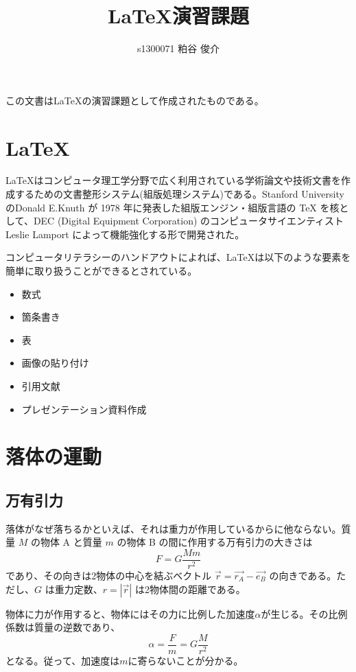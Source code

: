 \documentclass[platex,a4paper,12pt,dvipdfmx]{jsarticle}
\title{{\LaTeX}演習課題}
\author{s1300071  粕谷 俊介}
\begin{document}
\maketitle %
この文書は{\LaTeX}の演習課題として作成されたものである。

\section{\LaTeX}

\LaTeX はコンピュータ理工学分野で広く利用されている学術論文や技術文書を作成するための文書整形システム(組版処理システム)である。Stanford UniversityのDonald E.Knuth が 1978 年に発表した組版エンジン・組版言語の TeX を核として、DEC (Digital Equipment Corporation) のコンピュータサイエンティスト Leslie Lamport によって機能強化する形で開発された。

コンピュータリテラシーのハンドアウト\cite{lit}によれば、\LaTeX は以下のような要素を簡単に取り扱うことができるとされている。

\begin{itemize}
  \item 数式
  \item 箇条書き
  \item 表
  \item 画像の貼り付け
  \item 引用文献
  \item プレゼンテーション資料作成
\end{itemize}


\section{落体の運動}

\subsection{万有引力}
落体がなぜ落ちるかといえば、それは重力が作用しているからに他ならない。質量 $ M $ の物体 A と質量 $ m $ の物体 B の間に作用する万有引力の大きさは
\[
  F = G \frac{Mm}{r^2}
\]
であり、その向きは2物体の中心を結ぶベクトル $ \vec{r} = \vec{r_A} - \vec{e_B} $ の向きである。ただし、$ G $ は重力定数、$ r = |\vec{r}| $ は2物体間の距離である。 

物体に力が作用すると、物体にはその力に比例した加速度$\alpha$が生じる。その比例係数は質量の逆数であり、
\begin{equation}
        \alpha = \frac{F}{m} = G \frac{M}{r^2}
\end{equation}
となる。従って、加速度は$m$に寄らないことが分かる。
\end{document}
